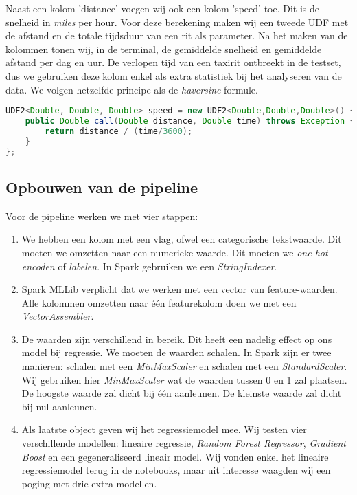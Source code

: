 \documentclass[a4paper,10pt,twoside]{report}
\begin{document}
Naast een kolom 'distance' voegen wij ook een kolom 'speed' toe. Dit is de snelheid in \textit{miles} per hour. Voor deze berekening maken wij een tweede UDF met de afstand en de totale tijdsduur van een rit als parameter. Na het maken van de kolommen tonen wij, in de terminal, de gemiddelde snelheid en gemiddelde afstand per dag en uur. De verlopen tijd van een taxirit ontbreekt in de testset, dus we gebruiken deze kolom enkel als extra statistiek bij het analyseren van de data. We volgen hetzelfde principe als de \textit{haversine}-formule.

\begin{lstlisting}[language=Java]
UDF2<Double, Double, Double> speed = new UDF2<Double,Double,Double>() {
	public Double call(Double distance, Double time) throws Exception {
		return distance / (time/3600);
	}
};
\end{lstlisting}

\newpage

\subsection*{Opbouwen van de pipeline}

Voor de pipeline werken we met vier stappen:

\begin{enumerate}
	\item We hebben een kolom met een vlag, ofwel een categorische tekstwaarde. Dit moeten we omzetten naar een numerieke waarde. Dit moeten we \textit{one-hot-encoden} of \textit{labelen}. In Spark gebruiken we een \textit{StringIndexer}.
	
	\item Spark MLLib verplicht dat we werken met een vector van feature-waarden. Alle kolommen omzetten naar één featurekolom doen we met een \textit{VectorAssembler}. 
	
	\item De waarden zijn verschillend in bereik. Dit heeft een nadelig effect op ons model bij regressie. We moeten de waarden schalen. In Spark zijn er twee manieren: schalen met een \textit{MinMaxScaler} en schalen met een \textit{StandardScaler}. Wij gebruiken hier \textit{MinMaxScaler} wat de waarden tussen 0 en 1 zal plaatsen. De hoogste waarde zal dicht bij één aanleunen. De kleinste waarde zal dicht bij nul aanleunen.
	
	\item Als laatste object geven wij het regressiemodel mee. Wij testen vier verschillende modellen: lineaire regressie, \textit{Random Forest Regressor}, \textit{Gradient Boost} en een gegeneraliseerd lineair model. Wij vonden enkel het lineaire regressiemodel terug in de notebooks, maar uit interesse waagden wij een poging met drie extra modellen. 
	
\end{enumerate}
\end{document}
